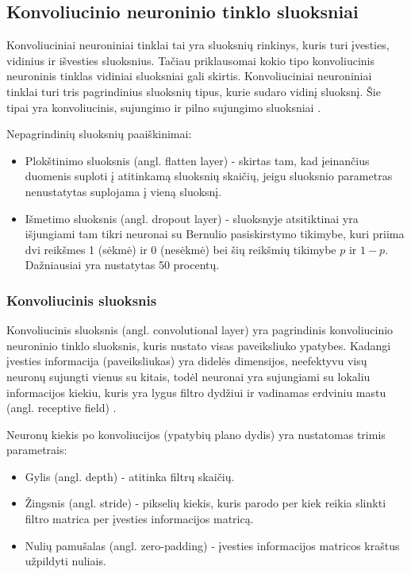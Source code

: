 \documentclass{VUMIFPSbakalaurinis}
\begin{document}
\subsection{Konvoliucinio neuroninio tinklo sluoksniai}
Konvoliuciniai neuroniniai tinklai tai yra sluoksnių rinkinys, kuris turi įvesties, vidinius ir išvesties sluoksnius. Tačiau priklausomai 
kokio tipo konvoliucinis neuroninis tinklas vidiniai sluoksniai gali skirtis. Konvoliuciniai neuroniniai tinklai turi tris pagrindinius 
sluoksnių tipus, kurie sudaro vidinį sluoksnį. Šie tipai yra konvoliucinis, sujungimo ir pilno sujungimo sluoksniai \cite{CNNbasic}.

Nepagrindinių sluoksnių paaiškinimai:
\begin{itemize}
\item Plokštinimo sluoksnis (angl. flatten layer) - skirtas tam, kad įeinančius duomenis suploti į atitinkamą sluoksnių skaičių, jeigu sluoksnio parametras nenustatytas suplojama į vieną sluoksnį.
\item Išmetimo sluoksnis (angl. dropout layer) - sluoksnyje atsitiktinai yra išjungiami tam tikri neuronai su Bernulio pasiskirstymo tikimybe, kuri priima dvi reikšmes 1 (sėkmė) ir 0 (nesėkmė) 
bei šių reikšmių tikimybe \(p\) ir \(1 - p\). Dažniausiai yra nustatytas 50 procentų.
\end{itemize}

\subsubsection{Konvoliucinis sluoksnis}
Konvoliucinis sluoksnis (angl. convolutional layer) yra pagrindinis konvoliucinio neuroninio tinklo sluoksnis, kuris nustato visas paveiksliuko ypatybes.
Kadangi įvesties informacija (paveiksliukas) yra didelės dimensijos, neefektyvu visų neuronų sujungti vienus su kitais, todėl neuronai yra sujungiami
su lokaliu informacijos kiekiu, kuris yra lygus filtro dydžiui ir vadinamas erdviniu mastu (angl. receptive field) \cite{layers-CS231n}.

Neuronų kiekis po konvoliucijos (ypatybių plano dydis) yra nustatomas trimis parametrais:
\begin{itemize}
\item Gylis (angl. depth) - atitinka filtrų skaičių.
\item Žingsnis (angl. stride) - pikselių kiekis, kuris parodo per kiek reikia slinkti filtro matrica per įvesties informacijos matricą.
\item Nulių pamušalas (angl. zero-padding) - įvesties informacijos matricos kraštus užpildyti nuliais.
\end{itemize}
\end{document}
